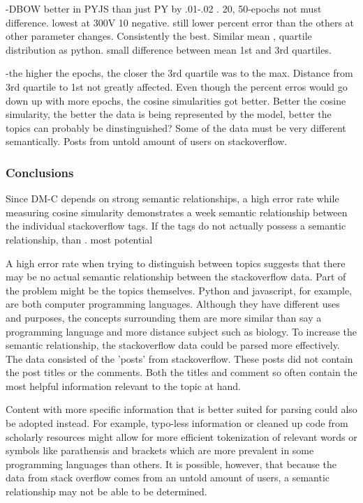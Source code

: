 -DBOW better in PYJS than just PY by .01-.02 . 20, 50-epochs not must difference. lowest at 300V 10 negative. still lower percent error than the others at other parameter changes. Consistently the best. Similar mean , quartile distribution as python. small difference between mean 1st and 3rd quartiles.


-the higher the epochs, the closer the 3rd quartile was to the max. Distance from 3rd quartile to 1st not greatly affected. Even though the percent erros would go down up with more epochs, the cosine simularities got better. Better the cosine simularity, the better the data is being represented by the model, better the topics can probably be dinstinguished? Some of the data must be very different semantically. Posts from untold amount of users on stackoverflow. 





 


\subsubsection{Conclusions}
Since DM-C depends on strong semantic relationships, a high error rate while measuring cosine simularity demonstrates a week semantic relationship between the individual stackoverflow tags. If the tags do not actually possess a semantic relationship, than . most potential

A high error rate when trying to distinguish between topics suggests that there may be no actual semantic relationship between the stackoverflow data. Part of the problem might be the topics themselves. Python and javascript, for example, are both computer programming languages. Although they have different uses and purposes, the concepts surrounding them are more similar than say a programming language and more distance subject such as biology. To increase the semantic relationship, the stackoverflow data could be parsed more effectively. The data consisted of the 'posts' from stackoverflow. These posts did not contain the post titles or the comments. Both the titles and comment so often contain the most helpful information relevant to the topic at hand. 

Content with more specific information that is better suited for parsing could also be adopted instead. For example, typo-less information or cleaned up code from scholarly resources might allow for more efficient tokenization of relevant words or symbols like parathensis and brackets which are more prevalent in some programming languages than others. It is possible, however, that because the data from stack overflow comes from an untold amount of users, a semantic relationship may not be able to be determined. 

